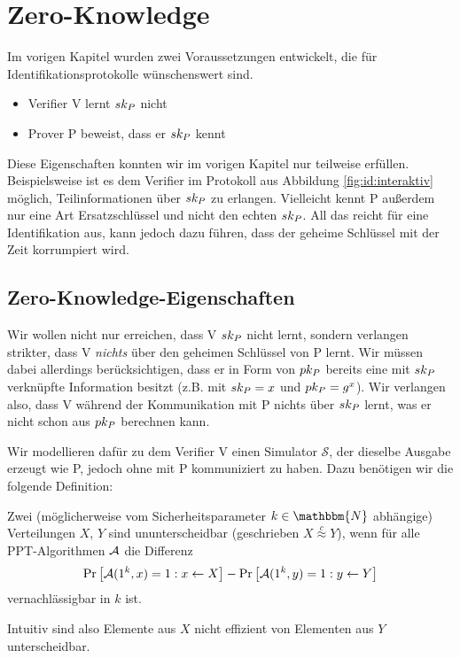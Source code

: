 \chapter{Zero-Knowledge}
Im vorigen Kapitel wurden zwei Voraussetzungen entwickelt, die für Identifikationsprotokolle wünschenswert sind.
\begin{itemize}
  \item Verifier V lernt $sk_P$ nicht
  \item Prover P beweist, dass er $sk_P$ kennt
\end{itemize}
Diese Eigenschaften konnten wir im vorigen Kapitel nur teilweise erfüllen. Beispielsweise ist es dem Verifier im Protokoll aus Abbildung
\ref{fig:id:interaktiv} möglich, Teilinformationen über $sk_P$ zu erlangen. Vielleicht kennt P außerdem nur eine Art Ersatzschlüssel und nicht den echten
$sk_P$. All das reicht für eine Identifikation aus, kann jedoch dazu führen, dass der geheime Schlüssel mit der Zeit korrumpiert wird.

\section{Zero-Knowledge-Eigenschaften}
Wir wollen nicht nur erreichen, dass V $sk_P$ nicht lernt, sondern verlangen strikter, dass V \emph{nichts} über den geheimen Schlüssel von
P lernt. Wir müssen dabei allerdings berücksichtigen, dass er in Form von $pk_P$ bereits eine mit $sk_P$ verknüpfte Information besitzt (z.B.
mit $sk_P = x$ und $pk_P = g^x$). Wir verlangen also, dass V während der Kommunikation mit P nichts über $sk_P$ lernt, was er nicht schon aus $pk_P$ berechnen kann.

Wir modellieren dafür zu dem Verifier V einen Simulator $\mathcal{S}$, der dieselbe Ausgabe erzeugt wie P, jedoch ohne mit P kommuniziert zu haben. Dazu benötigen wir die folgende Definition:
\begin{definition}[Ununterscheidbarkeit]
\label{def:zk:ununterscheidbarkeit}
Zwei (möglicherweise vom Sicherheitsparameter $k \in \mathbbm{N}$ abhängige) Verteilungen $X$, $Y$ sind ununterscheidbar (geschrieben $X
\stackrel{c}\approx Y$), wenn für alle PPT-Algorithmen $\mathcal{A}$ die Differenz
\begin{align*}
\Pr \left[ \mathcal{A}(1^k,x) = 1 : x \leftarrow X \right] - \Pr \left[ \mathcal{A}(1^k, y) = 1 : y \leftarrow Y \right]
\end{align*}
vernachlässigbar in $k$ ist.
\end{definition}
Intuitiv sind also Elemente aus $X$ nicht effizient von Elementen aus $Y$ unterscheidbar.

